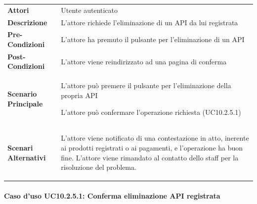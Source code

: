 \begin{minipage}{\linewidth}
	\begin{tabular}{ l | p{11cm}}
		\hline
		\rowcolor{Gray}
		\multicolumn{2}{c}{UC10.2.5 - Eliminazione API registrata} \\
		\hline
		\textbf{Attori} & Utente autenticato \\
		\textbf{Descrizione} & L'attore richiede l'eliminazione di un API da lui registrata\\
		\textbf{Pre-Condizioni} & L'attore ha premuto il pulsante per l'eliminazione di un API\\
		\textbf{Post-Condizioni} & L'attore viene reindirizzato ad una pagina di conferma\\
		\textbf{Scenario Principale} & 
		\begin{enumerate*}[label=(\arabic*.),itemjoin={\newline}]
			\item L'attore può premere il pulsante per l'eliminazione della propria API
			\item L'attore può confermare l'operazione richiesta (UC10.2.5.1)
		\end{enumerate*}\\
		\textbf{Scenari Alternativi} & 
		\begin{enumerate*}[label=(\arabic*.),itemjoin={\newline}]
			\item L'attore viene notificato di una contestazione in atto, inerente ai prodotti registrati o ai pagamenti, e l'operazione ha buon fine. L'attore viene rimandato al contatto dello staff per la risoluzione del problema.
		\end{enumerate*}\\
	\end{tabular}
\end{minipage}

\paragraph{Caso d'uso UC10.2.5.1: Conferma eliminazione API registrata}
\label{UC10_2_5_1}

